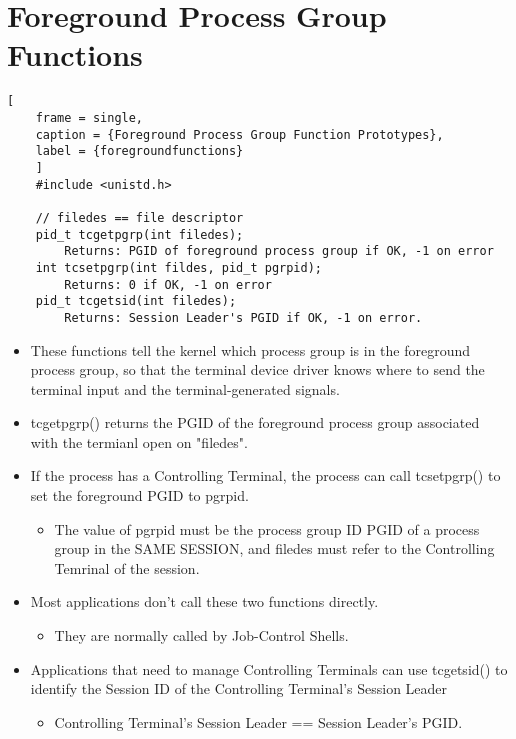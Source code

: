 \documentclass{article}
\begin{document}
\section{Foreground Process Group Functions}
\begin{lstlisting}[
    frame = single,
    caption = {Foreground Process Group Function Prototypes},
    label = {foregroundfunctions}
    ]
    #include <unistd.h>

    // filedes == file descriptor
    pid_t tcgetpgrp(int filedes);
        Returns: PGID of foreground process group if OK, -1 on error
    int tcsetpgrp(int fildes, pid_t pgrpid);
        Returns: 0 if OK, -1 on error
    pid_t tcgetsid(int filedes);
        Returns: Session Leader's PGID if OK, -1 on error.
\end{lstlisting}
\begin{itemize}
\item These functions tell the kernel which process group is in the foreground process group, so that the terminal device driver knows where to send the terminal input and the terminal-generated signals.
\item tcgetpgrp() returns the PGID of the foreground process group associated with the termianl open on "filedes".
\item If the process has a Controlling Terminal, the process can call tcsetpgrp() to set the foreground PGID to pgrpid.
    \begin{itemize}
        \item The value of pgrpid must be the process group ID PGID of a process group in the SAME SESSION, and filedes must refer to the Controlling Temrinal of the session.
    \end{itemize}
\item Most applications don't call these two functions directly.
    \begin{itemize}
        \item They are normally called by Job-Control Shells.
    \end{itemize}
\item Applications that need to manage Controlling Terminals can use tcgetsid() to identify the Session ID of the Controlling Terminal's Session Leader
    \begin{itemize}
        \item Controlling Terminal's Session Leader == Session Leader's PGID.
    \end{itemize}
\end{itemize}
\end{document}
